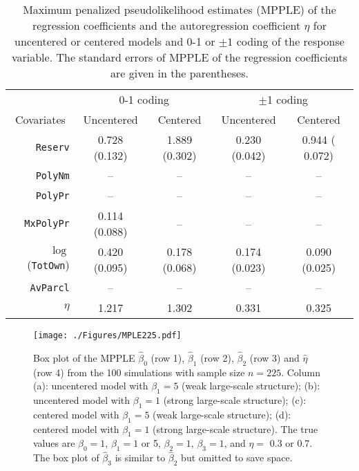 \documentclass[authoryear,review, 12pt]{elsarticle}
\begin{document}
\begin{table}[!htbp]
\caption{Maximum penalized pseudolikelihood estimates (MPPLE) of the regression coefficients and the autoregression coefficient $\eta$ for uncentered or centered models and 0-1 or $\pm 1$ coding of the response variable. The standard errors of MPPLE of the regression coefficients are given in the parentheses.} %
\centering  %
\begin{tabular}{rcccc} %
\hline\hline                        %
 &  \multicolumn{2}{c}{0-1 coding} & \multicolumn{2}{c}{$\pm$1 coding}\\
\multicolumn{1}{c}{Covariates} & Uncentered & Centered & Uncentered & Centered \\ [0.5ex]  %
\hline                  %
{\tt Reserv}        &  0.728 (0.132) & 1.889 (0.302)&  0.230 (0.042) & 0.944 ( 0.072)\\ 
{\tt PolyNm}        &  -- & --& -- & --\\
{\tt PolyPr}        &  -- & --& -- & --\\
{\tt MxPolyPr}       &  0.114 (0.088) & --& -- & --\\
$\log$({\tt TotOwn})        &  0.420 (0.095) & 0.178 (0.068)&  0.174 (0.023) & 0.090 (0.025)\\
{\tt AvParcl}        &  -- & --&  -- & --\\
$\eta$        &  1.217 & 1.302 & 0.331 & 0.325\\\hline %
\end{tabular}
\label{tab:data} %
\end{table}

%
%
\begin{figure}[ht]
\begin{center}
\texttt{[image: ./Figures/MPLE225.pdf]}
\end{center}
\caption{Box plot of the MPPLE $\widehat{\beta}_0$ (row 1), $\widehat{\beta}_1$ (row 2), $\widehat{\beta}_2$ (row 3) and $\widehat{\eta}$ (row 4) from the 100 simulations with sample size $n=225$. Column (a): uncentered model with $\beta_1=5$ (weak large-scale structure); (b): uncentered model with $\beta_1=1$ (strong large-scale structure); (c): centered model with $\beta_1=5$ (weak large-scale structure); (d): centered model with $\beta_1=1$ (strong large-scale structure). The true values are $\beta_0=1$, $\beta_1=1$ or 5, $\beta_2=1$, $\beta_3=1$, and $\eta=$ 0.3 or 0.7. The box plot of $\widehat{\beta}_3$ is similar to $\widehat{\beta}_2$ but omitted to save space.}
\label{fig:mple225}
\end{figure}
\end{document}
